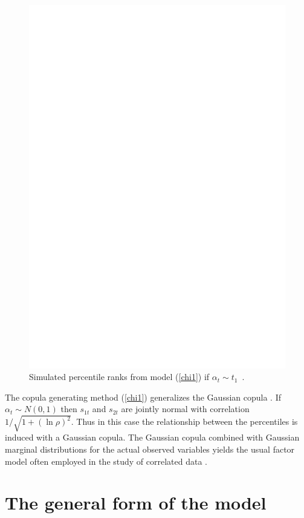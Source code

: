 \documentclass[a4paper,12pt]{article}
\newcommand{\eref}[1]{(\ref{#1})}
\begin{document}
\begin{figure}[htb]
\centering
\includegraphics{fig2.eps}
\caption{Simulated percentile ranks from model (\ref{chi1}) if $\alpha_t\sim t_1$\ .}\label{fig2}
\end{figure}

The copula generating method \eref{chi1} generalizes the Gaussian copula \cite{mcneil2005qrm}.   If $\alpha_t\sim N(0,1)$ then $s_{1t}$ and $s_{2t}$ are jointly normal with correlation
$
    1/\sqrt{1+(\ln\rho)^2}
$.
Thus  in this case the relationship between the percentiles is induced with a Gaussian copula.  The Gaussian copula  combined with Gaussian marginal distributions for the actual observed variables yields the usual factor model often employed in the study of correlated data \cite{dnlawley1971fas}.


\section{The general form of the model}
\end{document}
